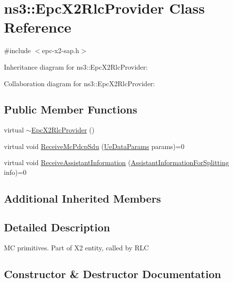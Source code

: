 \hypertarget{classns3_1_1EpcX2RlcProvider}{}\section{ns3\+:\+:Epc\+X2\+Rlc\+Provider Class Reference}
\label{classns3_1_1EpcX2RlcProvider}


{\ttfamily \#include $<$epc-\/x2-\/sap.\+h$>$}



Inheritance diagram for ns3\+:\+:Epc\+X2\+Rlc\+Provider\+:


Collaboration diagram for ns3\+:\+:Epc\+X2\+Rlc\+Provider\+:
\subsection*{Public Member Functions}
\begin{DoxyCompactItemize}
\item 
virtual \hyperlink{classns3_1_1EpcX2RlcProvider_ad6a993c5902d56d82599b8296232aa6d}{$\sim$\+Epc\+X2\+Rlc\+Provider} ()
\item 
virtual void \hyperlink{classns3_1_1EpcX2RlcProvider_ae58a8184e3a1b3243f328b8d0efe3352}{Receive\+Mc\+Pdcp\+Sdu} (\hyperlink{structns3_1_1EpcX2Sap_1_1UeDataParams}{Ue\+Data\+Params} params)=0
\item 
virtual void \hyperlink{classns3_1_1EpcX2RlcProvider_aac32484a4ef127a3e692e80152fc1219}{Receive\+Assistant\+Information} (\hyperlink{structns3_1_1EpcX2Sap_1_1AssistantInformationForSplitting}{Assistant\+Information\+For\+Splitting} info)=0
\end{DoxyCompactItemize}
\subsection*{Additional Inherited Members}


\subsection{Detailed Description}
MC primitives. Part of X2 entity, called by R\+LC 

\subsection{Constructor \& Destructor Documentation}
